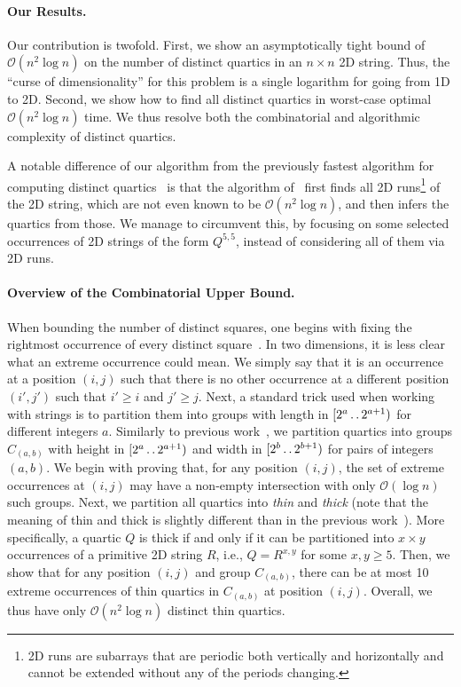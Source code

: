 \documentclass[11pt,letterpaper]{article}
\newcommand{\cO}{\mathcal{O}}
\newcommand{\can}[2]{C_{(#1,#2)}}
\def\dd{\mathinner{.\,.}}
\begin{document}
\paragraph{Our Results.}
Our contribution is twofold. First, we show an asymptotically tight bound of $\cO(n^{2}\log n)$ on the number of
distinct quartics in an $n\times n$ 2D string.
Thus, the ``curse of dimensionality'' for this problem is a single logarithm for going from 1D to 2D.
Second, we show how to find all distinct quartics in worst-case optimal $\cO(n^{2}\log n)$ time.
We thus resolve both the combinatorial and algorithmic complexity of distinct quartics.

A notable difference of our algorithm from the previously fastest algorithm for computing distinct quartics~\cite{CRRWZ} is that the algorithm of~\cite{CRRWZ} first finds all 2D runs\footnote{2D runs are subarrays that are periodic both vertically and horizontally and cannot be extended without any of the periods changing.} of the 2D string, which are not even known to be $\cO(n^2 \log n)$, and then infers the quartics from those.
We manage to circumvent this, by focusing on some selected occurrences of 2D strings of the form $Q^{5,5}$, instead of considering all of them via 2D runs.

\paragraph{Overview of the Combinatorial Upper Bound.}
When bounding the number of distinct squares, one begins with fixing the rightmost occurrence of every distinct
square~\cite{DBLP:journals/jct/FraenkelS98}. In two dimensions, it is less clear what an extreme occurrence could mean.
We simply say that it is an occurrence at a position $(i,j)$ such that there is no other occurrence at a different position $(i',j')$
such that $i' \geq i$ and $j'\geq j$.
Next, a standard trick used when working with strings is to partition them into groups with length in $[2^{a} \dd 2^{a+1})$
for different integers $a$.
Similarly to previous work~\cite{CRRWZ}, we partition quartics into groups $\can{a}{b}$ with height in $[2^{a} \dd 2^{a+1})$
and width in $[2^{b} \dd 2^{b+1})$ for pairs of integers $(a,b)$.
We begin with proving that, for any position $(i,j)$, the set of extreme occurrences at $(i,j)$ may have a non-empty
intersection with only $\cO(\log n)$ such groups.
Next, we partition all quartics into \emph{thin} and \emph{thick} (note that the meaning of thin and thick is slightly different
than in the previous work~\cite{CRRWZ}).
More specifically, a quartic $Q$ is thick if and only if it can be partitioned into $x \times y$ occurrences of a primitive 2D string $R$, i.e., $Q = R^{x,y}$ for some $x,y\geq 5$.
Then, we show that for any position $(i,j)$ and group $\can{a}{b}$, there can be at most 10 extreme occurrences
of thin quartics in $\can{a}{b}$ at position $(i,j)$.
Overall, we thus have only $\cO(n^{2}\log n)$ distinct thin quartics.
\end{document}
